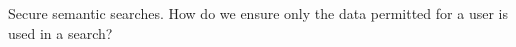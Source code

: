 \textsf{Secure semantic searches.  How do we ensure only the data permitted for a user is used in a search?}
